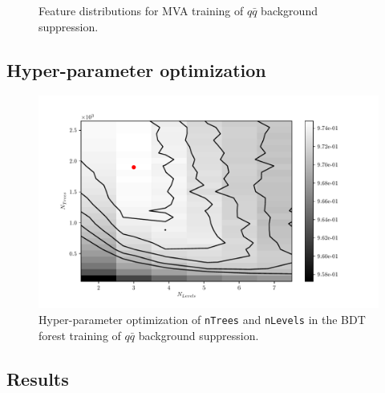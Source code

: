 \begin{figure}[H]
\caption{Feature distributions for MVA training of $q\bar q$ background suppression.}
\end{figure}

\subsection*{Hyper-parameter optimization}

\begin{figure}[H]
\centering
\captionsetup{width=0.8\linewidth}
\includegraphics[width=\linewidth]{fig/addendums/QQcC_hpo}
\caption{Hyper-parameter optimization of \texttt{nTrees} and \texttt{nLevels} in the BDT forest training of $q\bar q$ background suppression.}
\end{figure}

\subsection*{Results}

